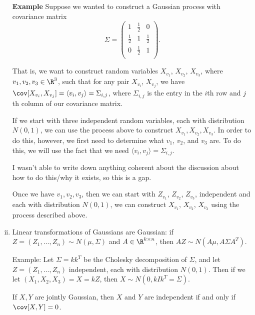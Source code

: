 \begin{enumerate}[(i)]
\textbf{Example} Suppose we wanted to construct a Gaussian process with covariance matrix \[\Sigma=\left(\begin{array}{ccc}
1 & \frac{1}{2} & 0\\
\frac{1}{2} & 1 & \frac{1}{2}\\
0 & \frac{1}{2} & 1\\
\end{array}\right).\]

That is, we want to construct random variables $X_{v_1}$, $X_{v_2}$, $X_{v_3}$, where $v_1,v_2,v_3\in\R^3$, such that for any pair $X_{v_i}$, $X_{v_j}$, we have $\cov[X_{v_i},X_{v_j}]=\langle v_i,v_j\rangle=\Sigma_{i,j}$, where $\Sigma_{i,j}$ is the entry in the $i$th row and $j$th column of our covariance matrix.

If we start with three independent random variables, each with distribution $N(0,1)$, we can use the process above to construct $X_{v_1},X_{v_2},X_{v_3}$.  In order to do this, however, we first need to determine what $v_1$, $v_2$, and $v_3$ are.  To do this, we will use the fact that we need $\langle v_i,v_j\rangle=\Sigma_{i,j}$.

I wasn't able to write down anything coherent about the discussion about how to do this/why it exists, so this is a gap.

Once we have $v_1,v_2,v_3$, then we can start with $Z_{v_1}$, $Z_{v_2}$, $Z_{v_3}$, independent and each with distribution $N(0,1)$, we can construct $X_{v_1}$, $X_{v_2}$, $X_{v_3}$ using the process described above.

\item Linear transformations of Gaussians are Gaussian: if $Z=(Z_1,\dots,Z_n)\sim N(\mu,\Sigma)$ and $A\in\R^{k\times n}$, then $AZ\sim N(A\mu, A\Sigma A^T)$.

Example: Let $\Sigma= kk^T$ be the Cholesky decomposition of $\Sigma$, and let $Z=(Z_1,\dots,Z_n)$ independent, each with distribution $N(0,1)$.  Then if we let $(X_1,X_2,X_3)=X=kZ$, then $X\sim N(0,kIk^T=\Sigma)$.

If $X,Y$ are jointly Gaussian, then $X$ and $Y$ are independent if and only if $\cov[X,Y]=0$.

\end{enumerate}


